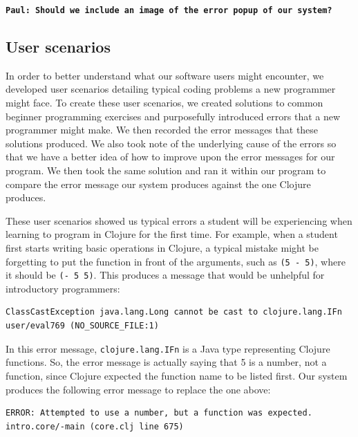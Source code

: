 \documentclass[12pt]{article}
\newcommand{\comment}[1]{{\bf \tt  {#1}}}
\newcommand{\pscomment}[1]{\textcolor{Coquelicot}{\comment{Paul: {#1}}}}
\newcommand{\alcomment}[1]{\textcolor{red}{\comment{Lemmon: {#1}}}}
\begin{document}

\pscomment{Should we include an image of the error popup of our system?}

\subsection{User scenarios}\label{sec:scenarios}

In order to better understand what our software users might encounter, we developed user scenarios detailing typical coding problems a new programmer might face.
To create these user scenarios, we created solutions to common beginner programming exercises and purposefully introduced errors that a new programmer might make.
We then recorded the error messages that these solutions produced.
We also took note of the underlying cause of the errors so that we have a better idea of how to improve upon the error messages for our program.
We then took the same solution and ran it within our program to compare the error message our system produces against the one Clojure produces.

These user scenarios showed us typical errors a student will be experiencing when learning to program in Clojure for the first time.
For example, when a student first starts writing basic operations in Clojure, a typical mistake might be forgetting to put the function in front of the arguments,
such as \texttt{(5 - 5)}, where it should be \texttt{(- 5 5)}. 
This produces a message that would be unhelpful for introductory programmers: 

\begin{verbatim}
ClassCastException java.lang.Long cannot be cast to clojure.lang.IFn
user/eval769 (NO_SOURCE_FILE:1)
\end{verbatim}

In this error message, \texttt{clojure.lang.IFn} is a Java type representing Clojure functions. So, the error message is actually saying that 5 is a number, not a function, since Clojure expected the function name to be listed first. Our system produces the following error message to replace the one above:

\begin{verbatim}
ERROR: Attempted to use a number, but a function was expected.
intro.core/-main (core.clj line 675)
\end{verbatim}
\end{document}
